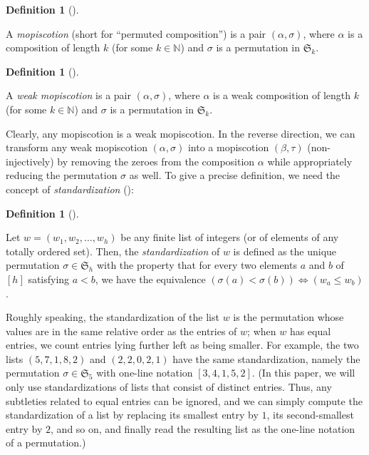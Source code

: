 \documentclass[numbers=enddot,12pt,final,onecolumn,notitlepage]{scrartcl}%
\theoremstyle{definition}
\newtheorem{defi}[theo]{Definition}
\newenvironment{definition}[1][]
{\begin{defi}[#1]\begin{leftbar}}
{\end{leftbar}\end{defi}}
\begin{document}
\begin{definition}
\label{def.mopis}A \emph{mopiscotion} (short for \textquotedblleft permuted
composition\textquotedblright) is a pair $\left(  \alpha,\sigma\right)  $,
where $\alpha$ is a composition of length $k$ (for some $k\in\mathbb{N}$) and
$\sigma$ is a permutation in $\mathfrak{S}_{k}$.
\end{definition}

\begin{definition}
\label{def.wmopis}A \emph{weak mopiscotion} is a pair $\left(  \alpha
,\sigma\right)  $, where $\alpha$ is a weak composition of length $k$ (for
some $k\in\mathbb{N}$) and $\sigma$ is a permutation in $\mathfrak{S}_{k}$.
\end{definition}

Clearly, any mopiscotion is a weak mopiscotion. In the reverse direction, we
can transform any weak mopiscotion $\left(  \alpha,\sigma\right)  $ into a
mopiscotion $\left(  \beta,\tau\right)  $ (non-injectively) by removing the
zeroes from the composition $\alpha$ while appropriately reducing the
permutation $\sigma$ as well. To give a precise definition, we need the
concept of \emph{standardization} (\cite[Definition 5.3.3]{GriRei}):

\begin{definition}
\label{def.std}Let $w=\left(  w_{1},w_{2},\ldots,w_{h}\right)  $ be any finite
list of integers (or of elements of any totally ordered set). Then, the
\emph{standardization} of $w$ is defined as the unique permutation $\sigma
\in\mathfrak{S}_{h}$ with the property that for every two elements $a$ and $b$
of $\left[  h\right]  $ satisfying $a<b$, we have the equivalence $\left(
\sigma\left(  a\right)  <\sigma\left(  b\right)  \right)  \Longleftrightarrow
\left(  w_{a}\leq w_{b}\right)  $.
\end{definition}

Roughly speaking, the standardization of the list $w$ is the permutation whose
values are in the same relative order as the entries of $w$; when $w$ has
equal entries, we count entries lying further left as being smaller. For
example, the two lists $\left(  5,7,1,8,2\right)  $ and $\left(
2,2,0,2,1\right)  $ have the same standardization, namely the permutation
$\sigma\in\mathfrak{S}_{5}$ with one-line notation $\left[  3,4,1,5,2\right]
$. (In this paper, we will only use standardizations of lists that consist of
distinct entries. Thus, any subtleties related to equal entries can be
ignored, and we can simply compute the standardization of a list by replacing
its smallest entry by $1$, its second-smallest entry by $2$, and so on, and
finally read the resulting list as the one-line notation of a permutation.)
\end{document}
